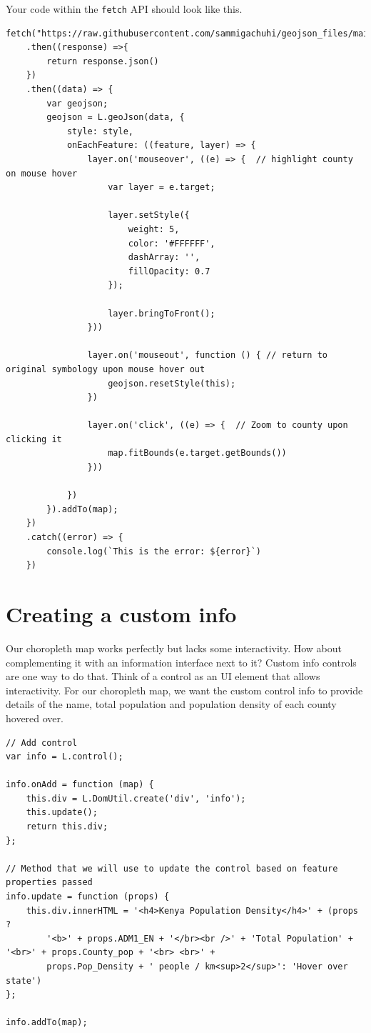 \documentclass[
]{book}
\begin{document}
Your code within the \texttt{fetch} API should look like this.

\begin{verbatim}
fetch("https://raw.githubusercontent.com/sammigachuhi/geojson_files/main/counties_json.json")
    .then((response) =>{
        return response.json()
    })
    .then((data) => {
        var geojson;
        geojson = L.geoJson(data, {
            style: style,
            onEachFeature: ((feature, layer) => {
                layer.on('mouseover', ((e) => {  // highlight county on mouse hover
                    var layer = e.target;
                
                    layer.setStyle({
                        weight: 5,
                        color: '#FFFFFF',
                        dashArray: '',
                        fillOpacity: 0.7
                    });
                
                    layer.bringToFront();
                }))

                layer.on('mouseout', function () { // return to original symbology upon mouse hover out
                    geojson.resetStyle(this);
                })

                layer.on('click', ((e) => {  // Zoom to county upon clicking it
                    map.fitBounds(e.target.getBounds())
                }))

            })
        }).addTo(map);
    })
    .catch((error) => {
        console.log(`This is the error: ${error}`)
    })
\end{verbatim}

\hypertarget{creating-a-custom-info}{%
\section{Creating a custom info}\label{creating-a-custom-info}}

Our choropleth map works perfectly but lacks some interactivity. How about complementing it with an information interface next to it? Custom info controls are one way to do that. Think of a control as an UI element that allows interactivity. For our choropleth map, we want the custom control info to provide details of the name, total population and population density of each county hovered over.

\begin{verbatim}
// Add control
var info = L.control();

info.onAdd = function (map) {
    this.div = L.DomUtil.create('div', 'info');
    this.update();
    return this.div;
};

// Method that we will use to update the control based on feature properties passed
info.update = function (props) {
    this.div.innerHTML = '<h4>Kenya Population Density</h4>' + (props ? 
        '<b>' + props.ADM1_EN + '</br><br />' + 'Total Population' + '<br>' + props.County_pop + '<br> <br>' + 
        props.Pop_Density + ' people / km<sup>2</sup>': 'Hover over state')
};

info.addTo(map);
\end{verbatim}
\end{document}
